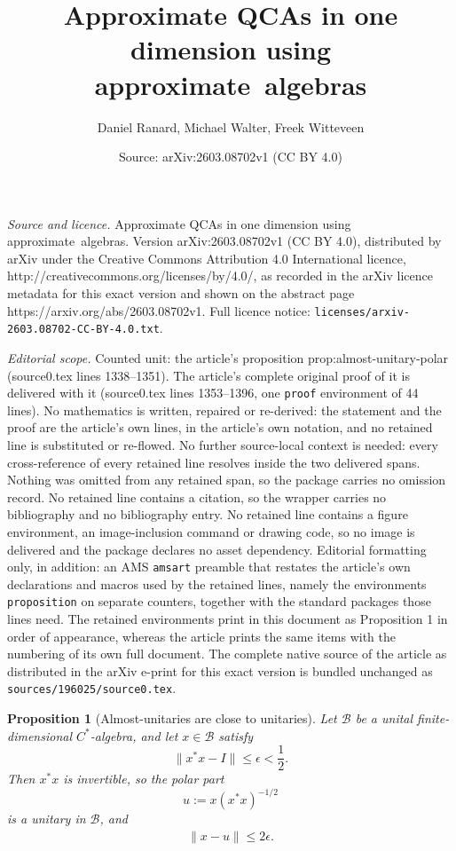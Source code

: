 \documentclass[10pt,a4paper]{amsart}
\title{Approximate QCAs in one dimension using approximate~algebras}
\author{Daniel Ranard, Michael Walter, Freek Witteveen}
\date{Source: arXiv:2603.08702v1 (CC BY 4.0)}
\newtheorem{proposition}{Proposition}
\newcommand{\cB}{\mathcal B}
\begin{document}
\maketitle

\noindent\emph{Source and licence.} Approximate QCAs in one dimension using approximate~algebras. Version arXiv:2603.08702v1 (CC BY 4.0), distributed by arXiv under the Creative Commons Attribution 4.0 International licence, http://creativecommons.org/licenses/by/4.0/, as recorded in the arXiv licence metadata for this exact version and shown on the abstract page https://arxiv.org/abs/2603.08702v1. Full licence notice: \texttt{licenses/arxiv-2603.08702-CC-BY-4.0.txt}.\par\smallskip

\noindent\textit{Editorial scope.} Counted unit: the article's proposition prop:almost-unitary-polar (source0.tex lines 1338--1351). The article's complete original proof of it is delivered with it (source0.tex lines 1353--1396, one \texttt{proof} environment of 44 lines). No mathematics is written, repaired or re-derived: the statement and the proof are the article's own lines, in the article's own notation, and no retained line is substituted or re-flowed.  No further source-local context is needed: every cross-reference of every retained line resolves inside the two delivered spans.  Nothing was omitted from any retained span, so the package carries no omission record.  No retained line contains a citation, so the wrapper carries no bibliography and no bibliography entry.  No retained line contains a figure environment, an image-inclusion command or drawing code, so no image is delivered and the package declares no asset dependency.  Editorial formatting only, in addition: an AMS \texttt{amsart} preamble that restates the article's own declarations and macros used by the retained lines, namely the environments \texttt{proposition} on separate counters, together with the standard packages those lines need.  The retained environments print in this document as Proposition 1 in order of appearance, whereas the article prints the same items with the numbering of its own full document.  The complete native source of the article as distributed in the arXiv e-print for this exact version is bundled unchanged as \texttt{sources/196025/source0.tex}.
\begin{proposition}[Almost-unitaries are close to unitaries]\label{prop:almost-unitary-polar}
Let $\cB$ be a unital finite-dimensional $C^*$-algebra, and let $x \in \cB$ satisfy
\[
\|x^*x-I\| \le \epsilon < \frac12.
\]
Then $x^*x$ is invertible, so the polar part
\[
u := x(x^*x)^{-1/2}
\]
is a unitary in $\cB$, and
\begin{align}
\|x-u\| \le 2\epsilon.
\end{align}
\end{proposition}
\end{document}
